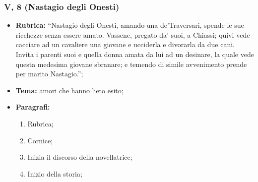 \documentclass{article}
\begin{document}
\subsubsection{V, 8 (Nastagio degli Onesti)}
\begin{itemize}
    \item \textbf{Rubrica:} ``Nastagio degli Onesti, amando una de’Traversari, spende le sue
        ricchezze senza essere amato. Vassene, pregato da’ suoi, a Chiassi; quivi vede
        cacciare ad un cavaliere una giovane e ucciderla e divorarla da due cani. Invita i
        parenti suoi e quella donna amata da lui ad un desinare, la quale vede questa
        medesima giovane sbranare; e temendo di simile avvenimento prende per marito
        Nastagio.'';
    \item \textbf{Tema:} amori che hanno lieto esito;
    \item \textbf{Paragrafi:}
        \begin{enumerate}
            \item Rubrica;
            \item Cornice;
            \item Inizia il discorso della novellatrice;
            \item Inizio della storia;
        \end{enumerate}
\end{itemize}
\end{document}
